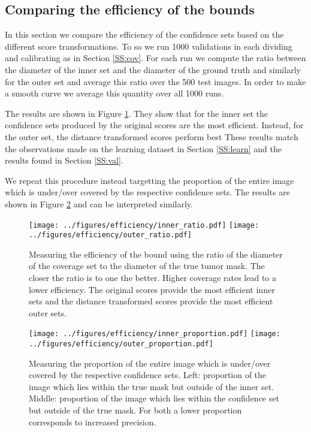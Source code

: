 \subsection{Comparing the efficiency of the bounds}
In this section we compare the efficiency of the confidence sets based on the different score transformations. To so we run 1000 validations in each dividing and calibrating as in Section \ref{SS:cov}. For each run we compute the ratio between the diameter of the inner set and the diameter of the ground truth and similarly for the outer set and average this ratio over the 500 test images. In order to make a smooth curve we average this quantity over all 1000 runs. 

The results are shown in Figure \ref{fig:efficiency}. They show that for the inner set the confidence sets produced by the original scores are the most efficient. Instead, for the outer set, the distance transformed scores perform best These results match the observations made on the learning dataset in Section \ref{SS:learn} and the results found in Section \ref{SS:val}.

We repeat this procedure instead targetting the proportion of the entire image which is under/over covered by the respective confidence sets. The results are shown in Figure \ref{fig:efficiency2} and can be interpreted similarly. 

\begin{figure}
	\begin{center}
			\texttt{[image: ../figures/efficiency/inner\_ratio.pdf]}
			\quad\quad
		\texttt{[image: ../figures/efficiency/outer\_ratio.pdf]}
	\end{center}
	\caption{Measuring the efficiency of the bound using the ratio of the diameter of the coverage set to the diameter of the true tumor mask. The closer the ratio is to one the better. Higher coverage rates lead to a lower efficiency. The original scores provide the most efficient inner sets and the distance transformed scores provide the most efficient outer sets.}\label{fig:efficiency}
\end{figure}

\begin{figure}
	\begin{center}
		\texttt{[image: ../figures/efficiency/inner\_proportion.pdf]}
		\quad\quad
		\texttt{[image: ../figures/efficiency/outer\_proportion.pdf]}
	\end{center}
	\caption{Measuring the proportion of the entire image which is under/over covered by the respective confidence sets. Left: proportion of the image which lies within the true mask but outside of the inner set. Middle: proportion of the image which lies within the confidence set but outside of the true mask. For both a lower proportion corresponds to increased precision. }\label{fig:efficiency2}
\end{figure}

